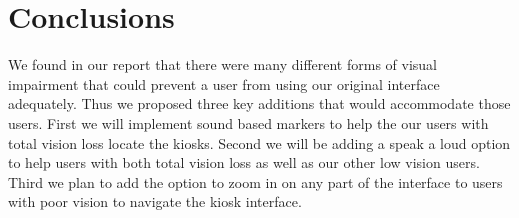 \documentclass{article}
\begin{document}
    \section{Conclusions}
        We found in our report that there were many different forms of visual impairment that could
        prevent a user from using our original interface adequately. Thus we proposed three key additions
        that would accommodate those users. First we will implement sound based markers to help the our users
        with total vision loss locate the kiosks. Second we will be adding a speak a loud option to help 
        users with both total vision loss as well as our other low vision users. Third we plan to add the option
        to zoom in on any part of the interface to users with poor vision to navigate the kiosk interface.
    \newpage

     
    
\end{document}
